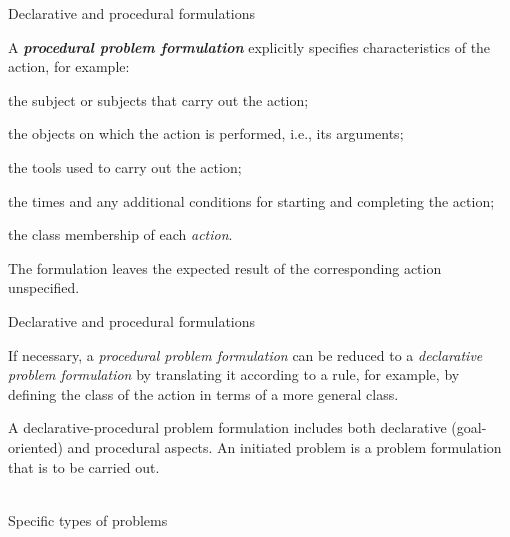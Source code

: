 \begin{frame}{Declarative and procedural formulations}
	\topline
	\justifying
	\small
	\par\vspace{8mm}
     A \textbf{\textit{procedural problem formulation}} explicitly specifies characteristics of the action, for example:
    \begin{textitemize}
    \item the subject or subjects that carry out the action;
    \item the objects on which the action is performed, i.e., its arguments;
    \item the tools used to carry out the action;
    \item the times and any additional conditions for starting and completing the action;
    \item the class membership of each \textit{action}.
    \end{textitemize}

	The formulation leaves the expected result of the corresponding action unspecified.

\end{frame}

\begin{frame}{Declarative and procedural formulations}
	\topline
	\justifying
	\vspace{10mm}

    If necessary, a \textit{procedural problem formulation} can be reduced to a \textit{declarative problem formulation} by translating it according to a rule, for example, by defining the class of the action in terms of a more general class.

    \bigskip

    A declarative-procedural problem formulation includes both declarative (goal-oriented) and procedural aspects. An initiated problem is a problem formulation that is to be carried out.

\end{frame}

\begin{frame}{\\Specific types of problems}
    \topline
	\justifying
    \begin{SCn}
    \end{SCn}
\end{frame}

